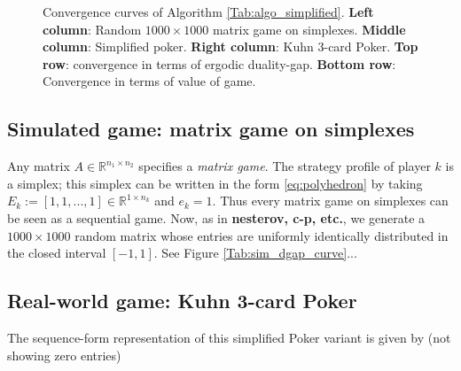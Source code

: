 \documentclass{article} %
\newtheorem{remark}{Remark}
\begin{document}
\begin{figure}[!htpb]
  \caption{Convergence curves of Algorithm
    \ref{Tab:algo_simplified}. \textbf{Left column}: Random $1000
    \times 1000$ matrix game on simplexes. \textbf{Middle column}:
    Simplified poker. \textbf{Right column}: Kuhn 3-card
    Poker. \textbf{Top row}: convergence in terms of ergodic
    duality-gap. \textbf{Bottom row}: Convergence in terms of value of
    game.}
  \label{Tab:dgap_curve}
\end{figure}


\subsection{Simulated game: matrix game on simplexes}
Any matrix $A \in \mathbb{R}^{n_1 \times n_2}$ specifies a
\textit{matrix game}. The strategy profile of player $k$ is a simplex;
this simplex can be written in the form \eqref{eq:polyhedron} by
taking $E_k := [1, 1, ..., 1] \in \mathbb{R}^{1 \times n_k}$ and $e_k
= 1$. Thus every matrix game on simplexes can be seen as a sequential
game. Now, as in \textbf{nesterov, c-p, etc.}, we generate a $1000
\times 1000$ random matrix whose entries are uniformly identically
distributed in the closed interval $[-1, 1]$. See Figure \ref{Tab:sim_dgap_curve}...

\subsection{Real-world game: Kuhn 3-card Poker}
The sequence-form representation of this simplified Poker variant
\cite{kuhn} is given by (not showing zero entries)\\
\end{document}
